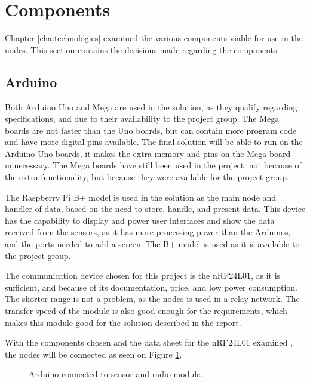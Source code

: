\section{Components}
Chapter \ref{cha:technologies} examined the various components viable for use in the nodes. This section contains the decisions made regarding the components.

\subsection{Arduino}
Both Arduino Uno and Mega are used in the solution, as they qualify regarding specifications, and due to their availability to the project group. The Mega boards are not faster than the Uno boards, but can contain more program code and have more digital pins available. The final solution will be able to run on the Arduino Uno boards, it makes the extra memory and pins on the Mega board unnecessary. The Mega boards have still been used in the project, not because of the extra functionality, but because they were available for the project group.

The Raspberry Pi B+ model is used in the solution as the main node and handler of data, based on the need to store, handle, and present data.  This device has the capability to display and power user interfaces and show the data received from the sensors, as it has more processing power than the Arduinos, and the ports needed to add a screen. The B+ model is used as it is available to the project group.

The communication device chosen for this project is the nRF24L01, as it is sufficient, and because of its documentation, price, and low power consumption. The shorter range is not a problem, as the nodes is used in a relay network. The transfer speed of the module is also good enough for the requirements, which makes this module good for the solution described in the report.

With the components chosen and the data sheet for the nRF24L01 examined \cite{nf24datasheet}, the nodes will be connected as seen on Figure \ref{fig:compsketch}.

\begin{figure}[!h]
	\centering
	\caption{Arduino connected to sensor and radio module.}
	\label{fig:compsketch}
\end{figure}

